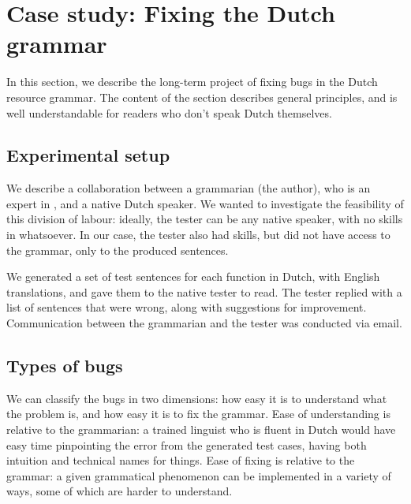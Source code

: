 \section{Case study: Fixing the Dutch grammar}
\label{dutch-experiment}

In this section, we describe the long-term project of fixing bugs in
the Dutch resource grammar. The content of the section describes
general principles, and is well understandable for readers who don't
speak Dutch themselves.


\subsection{Experimental setup}\label{experimental-setup}

We describe a collaboration between a grammarian (the author), who is an
expert in \gf, and a native Dutch speaker. We wanted to investigate the
feasibility of this division of labour: ideally, the tester can be any
native speaker, with no skills in \gf{} whatsoever. In our case, the tester
also had \gf{} skills, but did not have access to the grammar, only to the
produced sentences.

We generated a set of test sentences for each function in Dutch, with
English translations, and gave them to the native tester to read. The
tester replied with a list of sentences that were wrong, along with
suggestions for improvement. Communication between the grammarian and
the tester was conducted via email.


\subsection{Types of bugs}\label{types-of-bugs}

We can classify the bugs in two dimensions: how easy it is to understand
what the problem is, and how easy it is to fix the grammar. Ease of
understanding is relative to the grammarian: a trained linguist who is
fluent in Dutch would have easy time pinpointing the error from the
generated test cases, having both intuition and technical names for
things. Ease of fixing is relative to the grammar: a given grammatical
phenomenon can be implemented in a variety of ways, some of which are
harder to understand.


